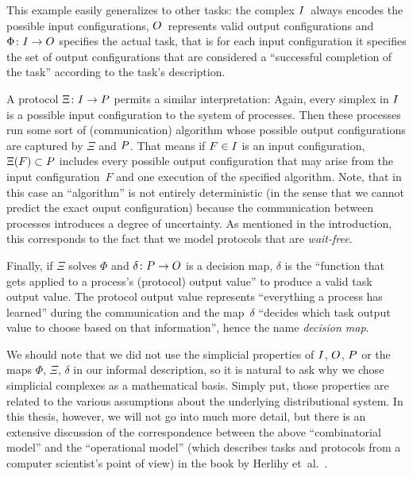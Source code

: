 This example easily generalizes to other tasks:
the complex $I$~always encodes the possible input configurations,
$O$~represents valid output configurations and $\Phi\colon I\to O$
specifies the actual task, that is for each input configuration it
specifies the set of output configurations that are considered a
\enquote{successful completion of the task} according to the task's
description.

A protocol $\Xi\colon I\to P$ permits a similar interpretation:
Again, every simplex in $I$ is a possible input configuration to
the system of processes. Then these processes run some sort of
(communication) algorithm whose possible output configurations are
captured by $\Xi$ and $P$. That means if $F\in I$ is an input
configuration, $\Xi(F) \subset P$ includes every possible output
configuration that may arise from the input configuration~$F$ and
one execution of the specified algorithm. Note, that in this case
an \enquote{algorithm} is not entirely deterministic (in the sense
that we cannot predict the exact ouput configuration) because the
communication between processes introduces a degree of uncertainty.
As mentioned %
in the introduction, this corresponds to the fact that we model
protocols that are \emph{wait-free}.

Finally, if $\Xi$ solves $\Phi$ and $\delta\colon P\to O$ is a decision
map, $\delta$ is the \enquote{function that gets applied
to a process's (protocol) output value} to produce a valid task
output value. The protocol output value represents \enquote{everything
a process has learned} during the communication and the map~$\delta$
\enquote{decides which task output value to choose based on that
information}, hence the name \emph{decision map}.

We should note that we did not use the simplicial properties of
$I$, $O$, $P$ or the maps $\Phi$, $\Xi$, $\delta$ in our
informal description, so it is natural to ask why we chose simplicial
complexes as a mathematical basis. Simply put, those properties are
related to the various assumptions about the underlying distributional
system. In this thesis, however, we will not go into much more detail,
but there is an extensive discussion of the correspondence between
the above \enquote{combinatorial model} and the \enquote{operational
model} (which describes tasks and protocols from a computer
scientist's point of view) in the book by
Herlihy et~al.~\cite[Ch.\,4]{bookc:herlihyetal13}.

